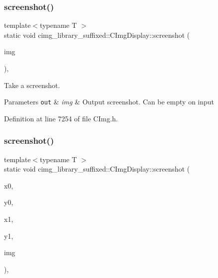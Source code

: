 \subsubsection{\texorpdfstring{screenshot()}{screenshot()}\hspace{0.1cm}{\footnotesize\ttfamily [1/2]}}
{\footnotesize\ttfamily template$<$typename T $>$ \\
static void cimg\+\_\+library\+\_\+suffixed\+::\+C\+Img\+Display\+::screenshot (\begin{DoxyParamCaption}\item[{\hyperlink{structcimg__library__suffixed_1_1CImg}{C\+Img}$<$ T $>$ \&}]{img }\end{DoxyParamCaption})\hspace{0.3cm}{\ttfamily [inline]}, {\ttfamily [static]}}



Take a screenshot. 


\begin{DoxyParams}[1]{Parameters}
\mbox{\tt out}  & {\em img} & Output screenshot. Can be empty on input \\
\hline
\end{DoxyParams}


Definition at line 7254 of file C\+Img.\+h.

\mbox{\label{structcimg__library__suffixed_1_1CImgDisplay_a264122e4cc7584dfa57678ceda68bfbb}} 
\subsubsection{\texorpdfstring{screenshot()}{screenshot()}\hspace{0.1cm}{\footnotesize\ttfamily [2/2]}}
{\footnotesize\ttfamily template$<$typename T $>$ \\
static void cimg\+\_\+library\+\_\+suffixed\+::\+C\+Img\+Display\+::screenshot (\begin{DoxyParamCaption}\item[{const int}]{x0,  }\item[{const int}]{y0,  }\item[{const int}]{x1,  }\item[{const int}]{y1,  }\item[{\hyperlink{structcimg__library__suffixed_1_1CImg}{C\+Img}$<$ T $>$ \&}]{img }\end{DoxyParamCaption})\hspace{0.3cm}{\ttfamily [inline]}, {\ttfamily [static]}}



